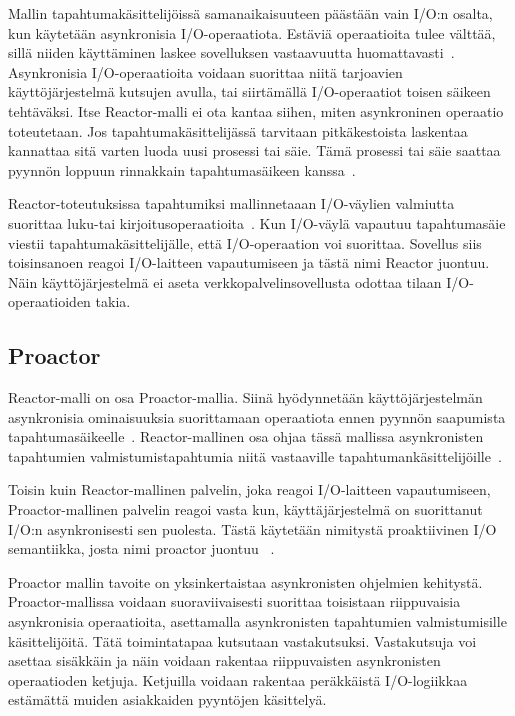 \documentclass[finnish]{tktltiki2}
\theoremstyle{definition}
\theoremstyle{remark}
\begin{document}
Mallin tapahtumakäsittelijöissä samanaikaisuuteen päästään
vain I/O:n osalta, kun käytetään asynkronisia
I/O-operaatiota.
Estäviä operaatioita tulee välttää,
sillä niiden käyttäminen laskee sovelluksen
vastaavuutta huomattavasti~\cite{schmidt_reactor:_1995}.
Asynkronisia I/O-operaatioita
voidaan suorittaa niitä tarjoavien käyttöjärjestelmä kutsujen
avulla, tai siirtämällä I/O-operaatiot toisen säikeen tehtäväksi.
Itse Reactor-malli ei ota kantaa siihen, miten asynkroninen operaatio toteutetaan.
Jos tapahtumakäsittelijässä tarvitaan pitkäkestoista laskentaa
kannattaa sitä varten luoda uusi prosessi tai säie. Tämä
prosessi tai säie saattaa pyynnön loppuun rinnakkain
tapahtumasäikeen kanssa~\cite{schmidt_reactor:_1995}.

Reactor-toteutuksissa tapahtumiksi mallinnetaaan I/O-väylien
valmiutta suorittaa luku-tai kirjoitusoperaatioita~\cite{schmidt_reactor:_1995}.
Kun I/O-väylä
vapautuu tapahtumasäie viestii tapahtumakäsittelijälle, että 
I/O-operaation voi suorittaa. Sovellus siis toisinsanoen
reagoi I/O-laitteen vapautumiseen ja tästä nimi Reactor juontuu.
Näin käyttöjärjestelmä ei aseta
verkkopalvelinsovellusta odottaa tilaan I/O-operaatioiden takia.


\subsection{Proactor}

Reactor-malli on osa Proactor-mallia.
Siinä hyödynnetään käyttöjärjestelmän asynkronisia ominaisuuksia suorittamaan
operaatiota ennen pyynnön saapumista tapahtumasäikeelle~\cite{pyarali_proactor_1997}.
Reactor-mallinen osa ohjaa tässä mallissa asynkronisten tapahtumien
valmistumistapahtumia niitä vastaaville tapahtumankäsittelijöille~\cite{pyarali_proactor_1997}.

Toisin kuin Reactor-mallinen palvelin, joka reagoi I/O-laitteen vapautumiseen,
Proactor-mallinen palvelin reagoi vasta kun, käyttäjärjestelmä
on suorittanut I/O:n asynkronisesti sen puolesta. Tästä käytetään nimitystä
proaktiivinen I/O semantiikka, josta nimi proactor juontuu ~\cite{pyarali_proactor_1997}.

Proactor mallin tavoite on yksinkertaistaa asynkronisten ohjelmien kehitystä.
Proactor-mallissa voidaan suoraviivaisesti suorittaa toisistaan riippuvaisia
asynkronisia operaatioita, asettamalla asynkronisten tapahtumien valmistumisille
käsittelijöitä.
Tätä toimintatapaa kutsutaan vastakutsuksi.
Vastakutsuja voi asettaa sisäkkäin ja näin voidaan rakentaa riippuvaisten
asynkronisten operaatioden ketjuja. Ketjuilla voidaan
rakentaa peräkkäistä I/O-logiikkaa estämättä muiden asiakkaiden
pyyntöjen käsittelyä.
\end{document}

